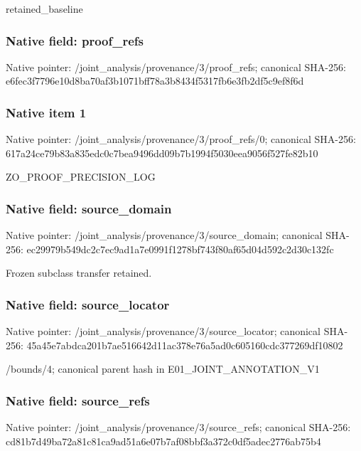 \documentclass[10pt,a4paper]{article}
\begin{document}
\begingroup\raggedright\sloppy retained\_\allowbreak{}baseline\par\endgroup

\subsubsection{Native field: proof\_\allowbreak{}refs}
Native pointer: /joint\_\allowbreak{}analysis/provenance/3/proof\_\allowbreak{}refs; canonical SHA-256: e6fec3f7796e10d8ba70af3b1071bff78a3b8434f5317fb6e3fb2df5c9ef8f6d

\subsubsection{Native item 1}
Native pointer: /joint\_\allowbreak{}analysis/provenance/3/proof\_\allowbreak{}refs/0; canonical SHA-256: 617a24ce79b83a835edc0c7bea9496dd09b7b1994f5030eea9056f527fe82b10

\begingroup\raggedright\sloppy ZO\_\allowbreak{}PROOF\_\allowbreak{}PRECISION\_\allowbreak{}LOG\par\endgroup

\subsubsection{Native field: source\_\allowbreak{}domain}
Native pointer: /joint\_\allowbreak{}analysis/provenance/3/source\_\allowbreak{}domain; canonical SHA-256: ec29979b549dc2c7ec9ad1a7e0991f1278bf743f80af65d04d592c2d30c132fc

\begingroup\raggedright\sloppy Frozen subclass transfer retained.\par\endgroup

\subsubsection{Native field: source\_\allowbreak{}locator}
Native pointer: /joint\_\allowbreak{}analysis/provenance/3/source\_\allowbreak{}locator; canonical SHA-256: 45a45e7abdca201b7ae516642d11ac378e76a5ad0c605160cdc377269df10802

\begingroup\raggedright\sloppy /\allowbreak{}bounds/\allowbreak{}4;\allowbreak{} canonical parent hash in E01\_\allowbreak{}JOINT\_\allowbreak{}ANNOTATION\_\allowbreak{}V1\par\endgroup

\subsubsection{Native field: source\_\allowbreak{}refs}
Native pointer: /joint\_\allowbreak{}analysis/provenance/3/source\_\allowbreak{}refs; canonical SHA-256: cd81b7d49ba72a81c81ca9ad51a6e07b7af08bbf3a372c0df5adec2776ab75b4
\end{document}
